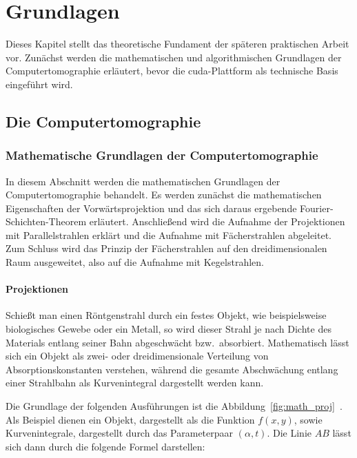 \chapter{Grundlagen}\label{chap:grundlagen}

Dieses Kapitel stellt das theoretische Fundament der späteren praktischen Arbeit vor. Zunächst werden die
mathematischen und algorithmischen Grundlagen der Computertomographie erläutert, bevor die \gls{cuda}-Plattform als
technische Basis eingeführt wird.

\section{Die Computertomographie}

\subsection{Mathematische Grundlagen der Computertomographie}

In diesem Abschnitt werden die mathematischen Grundlagen der Computertomographie behandelt. Es werden zunächst die
mathematischen Eigenschaften der Vorwärtsprojektion und das sich daraus ergebende Fourier-Schichten-Theorem erläutert.
Anschließend wird die Aufnahme der Projektionen mit Parallelstrahlen erklärt und die Aufnahme mit Fächerstrahlen
abgeleitet. Zum Schluss wird das Prinzip der Fächerstrahlen auf den dreidimensionalen Raum ausgeweitet, also auf die
Aufnahme mit Kegelstrahlen.

\subsubsection{Projektionen}

Schießt man einen Röntgenstrahl durch ein festes Objekt, wie beispielsweise biologisches Gewebe oder ein Metall, so wird
dieser Strahl je nach Dichte des Materials entlang seiner Bahn abgeschwächt bzw.\ absorbiert. Mathematisch lässt sich
ein Objekt als zwei- oder dreidimensionale Verteilung von Absorptionskonstanten verstehen, während die gesamte
Abschwächung entlang einer Strahlbahn als Kurvenintegral dargestellt werden kann.

Die Grundlage der folgenden Ausführungen ist die Abbildung~\ref{fig:math_proj}~\cite{kak}. Als Beispiel dienen ein
Objekt, dargestellt als die Funktion $f(x, y)$, sowie Kurvenintegrale, dargestellt durch das Parameterpaar
$(\alpha, t)$. Die Linie $AB$ lässt sich dann durch die folgende Formel darstellen:

